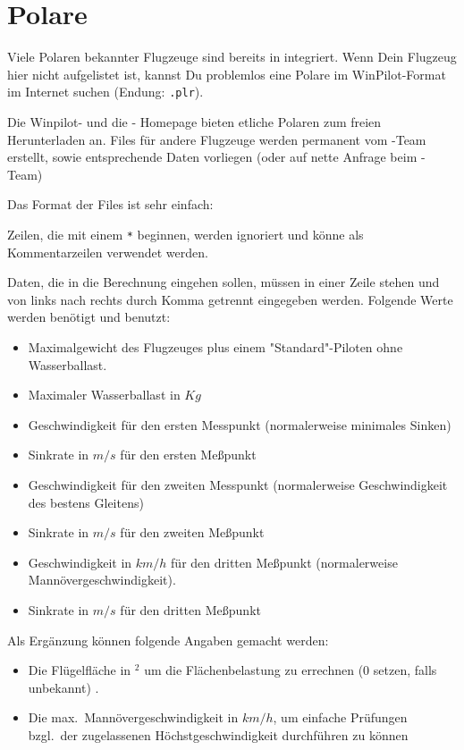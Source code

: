 \section{Polare}\label{sec:glide-polar}

Viele Polaren bekannter Flugzeuge sind bereits in \xc integriert.  Wenn Dein Flugzeug  hier nicht
aufgelistet ist, kannst Du problemlos eine Polare im {\sc WinPilot}-Format im Internet suchen (Endung:
\verb|.plr|).

Die Winpilot- und die \xc - Homepage bieten etliche Polaren zum freien Herunterladen an. Files für
andere Flugzeuge werden permanent vom \xc-Team erstellt, sowie entsprechende Daten vorliegen (oder
auf nette Anfrage beim \xc-Team)

Das Format der Files ist sehr einfach:

Zeilen, die mit einem \verb|*| beginnen, werden ignoriert und könne als Kommentarzeilen verwendet
werden.

Daten, die in die Berechnung eingehen sollen, müssen in einer Zeile stehen und von links nach rechts durch
Komma getrennt eingegeben werden. Folgende Werte werden benötigt und benutzt:

\begin{itemize}
\item Maximalgewicht des Flugzeuges  plus einem "Standard"-Piloten ohne Wasserballast.
\item Maximaler Wasserballast in $Kg$
\item Geschwindigkeit für den ersten Messpunkt (normalerweise minimales Sinken)
\item Sinkrate in $m/s$ für den ersten Meßpunkt
\item Geschwindigkeit für den zweiten  Messpunkt (normalerweise Geschwindigkeit des bestens
    Gleitens)
\item Sinkrate in $m/s$ für den zweiten Meßpunkt
\item Geschwindigkeit in $km/h$ für den dritten Meßpunkt  (normalerweise Mannövergeschwindigkeit).
\item Sinkrate in $m/s$ für den dritten Meßpunkt
\end{itemize}

Als Ergänzung können folgende Angaben gemacht werden:
\begin{itemize}
\item Die Flügelfläche in $^2$ um die Flächenbelastung zu errechnen  (0 setzen, falls unbekannt) .
\item Die max.\  Mannövergeschwindigkeit in $km/h$, um einfache Prüfungen bzgl.\
 der zugelassenen Höchstgeschwindigkeit durchführen zu können
\end{itemize}

